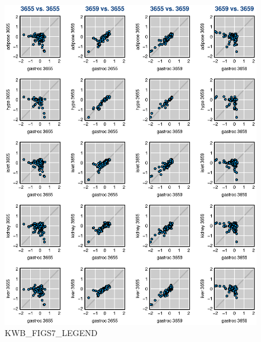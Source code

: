 \documentclass[letterpaper,twoside]{article}
\begin{document}
\begin{figure}[p]
\centerline{\includegraphics{SuppFigs/figS7.eps}}

\caption{KWB_FIGS7_LEGEND}
\end{figure}


\clearpage
\end{document}

